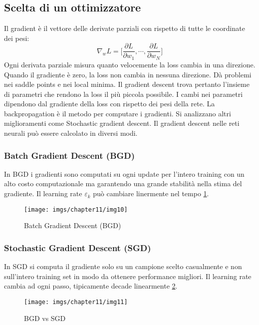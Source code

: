	\subsection{Scelta di un ottimizzatore}
	Il gradient \`e il vettore delle derivate parziali con rispetto di tutte le coordinate dei pesi:
	$$\nabla_w L = \bigl[\frac{\partial L}{\partial w_1}, \cdots, \frac{\partial L}{\partial w_N}\bigr]$$
	Ogni derivata parziale misura quanto velocemente la loss cambia in una direzione.
	Quando il gradiente \`e zero, la loss non cambia in nessuna direzione.
	D\`a problemi nei saddle points e nei local minima.
	Il gradient descent trova pertanto l'insieme di parametri che rendono la loss il pi\`u piccola possibile.
	I cambi nei parametri dipendono dal gradiente della loss con rispetto dei pesi della rete.
	La backpropagation \`e il metodo per computare i gradienti.
	Si analizzano altri miglioramenti come Stochastic gradient descent.
	Il gradient descent nelle reti neurali pu\`o essere calcolato in diversi modi.

		\subsubsection{Batch Gradient Descent (BGD)}
		In BGD i gradienti sono computati su ogni update per l'intero training con un alto costo computazionale ma garantendo una grande stabilit\`a nella stima del gradiente.
		Il learning rate $\varepsilon_k$ pu\`o cambiare linermente nel tempo \ref{fig:chapter11-10}.\\
		
		
		\begin{figure}
			\centering
			\texttt{[image: imgs/chapter11/img10]}
			\caption{Batch Gradient Descent (BGD)}
			\label{fig:chapter11-10}
		\end{figure}
		
		\subsubsection{Stochastic Gradient Descent (SGD)}
		In SGD si computa il gradiente solo su un campione scelto casualmente e non sull'intero training set in modo da ottenere performance migliori.
		Il learning rate cambia ad ogni passo, tipicamente decade linearmente \ref{fig:chapter11-11}.
		
		
		
		\begin{figure}
			\centering
			\texttt{[image: imgs/chapter11/img11]}
			\caption{BGD vs SGD}
			\label{fig:chapter11-11}
		\end{figure}
		
